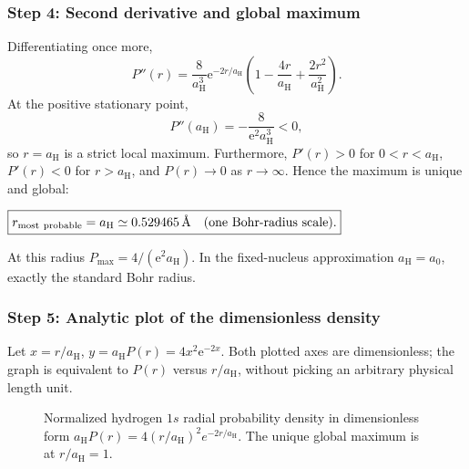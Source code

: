 \documentclass[11pt,a4paper]{article}
\newcommand{\key}[1]{\begin{resultbox}\centering\(\displaystyle #1\)\end{resultbox}}
\newcommand{\ee}{\mathrm{e}}
\newcommand{\aH}{a_{\mathrm H}}
\begin{document}
\subsubsection*{Step 4: Second derivative and global maximum}
Differentiating once more,
\begin{equation}\boxed{P''(r)=\frac8{\aH^3}\ee^{-2r/\aH}\left(1-\frac{4r}{\aH}+\frac{2r^2}{\aH^2}\right).}\end{equation}
At the positive stationary point,
\begin{equation}\boxed{P''(\aH)=-\frac8{\ee^2\aH^3}<0,}\end{equation}
so \(r=\aH\) is a strict local maximum. Furthermore, \(P'(r)>0\) for \(0<r<\aH\), \(P'(r)<0\) for \(r>\aH\), and \(P(r)\to0\) as \(r\to\infty\). Hence the maximum is unique and global:
\key{\boxed{r_{\rm most\ probable}=\aH\simeq0.529465\,\text{\AA}\quad\text{(one Bohr-radius scale).}}}
At this radius \(P_{\max}=4/(\ee^2\aH)\). In the fixed-nucleus approximation \(\aH=a_0\), exactly the standard Bohr radius.

\subsubsection*{Step 5: Analytic plot of the dimensionless density}
Let \(x=r/\aH\), \(y=\aH P(r)=4x^2\ee^{-2x}\). Both plotted axes are dimensionless; the graph is equivalent to \(P(r)\) versus \(r/\aH\), without picking an arbitrary physical length unit.
\begin{figure}[H]
\centering
{}
\caption{Normalized hydrogen \(1s\) radial probability density in dimensionless form \(\aH P(r)=4(r/\aH)^2e^{-2r/\aH}\). The unique global maximum is at \(r/\aH=1\).}
\label{fig:hydrogenradial}
\end{figure}
\end{document}
